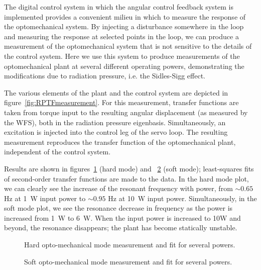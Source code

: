The digital control system in which the angular control feedback
system is implemented provides a convenient milieu in which to measure
the response of the optomechanical system.  By injecting a disturbance
somewhere in the loop and measuring the response at selected points in
the loop, we can produce a measurement of the optomechanical system
that is not sensitive to the details of the control system.   Here we
use this system to produce measurements of the optomechanical plant at
several different operating powers, demonstrating the modifications due
to radiation pressure, i.e. the Sidles-Sigg effect.

The various elements of the plant and the control system are depicted
in figure~\ref{fig:RPTFmeasurement}.  For this measurement, transfer
functions are taken from torque input to the resulting angular
displacement (as measured by the WFS), both in the radiation pressure
eigenbasis.  Simultaneously, an excitation is injected into the
control leg of the servo loop.  The resulting measurement reproduces
the transfer function of the optomechanical plant, independent of the
control system.

Results are shown in figures~\ref{fig:hardTF} (hard mode) and
~\ref{fig:softTF} (soft mode); least-squares fits of second-order
transfer functions are made to the data.  In the hard mode plot, we
can clearly see the increase of the resonant frequency with power,
from $\sim0.65$ Hz at 1~W input power to $\sim0.95$ Hz at 10~W input
power.  Simultaneously, in the soft mode plot, we see the resonance
decrease in frequency as the power is increased from 1~W to 6~W.  When
the input power is increased to 10W and beyond, the resonance
disappears; the plant has become statically unstable.

\begin{figure}
\begin{centering}
\caption{Hard opto-mechanical mode measurement and fit for several
 powers.}
\label{fig:hardTF}
\end{centering}
\end{figure}

\begin{figure}
\begin{centering}
\caption{Soft opto-mechanical mode measurement and fit for several
 powers.}
\label{fig:softTF}
\end{centering}
\end{figure}

